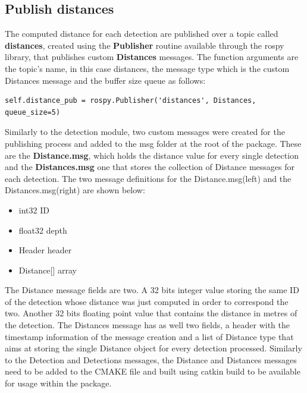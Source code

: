 \subsection{Publish distances}

The computed distance for each detection are published over a topic called \textbf{distances}, created using the \textbf{Publisher} routine available through the rospy library, that publishes custom \textbf{Distances} messages. The function arguments are the topic's name, in this case distances, the message type which is the custom Distances message and the buffer size queue as follows:

\begin{lstlisting}
self.distance_pub = rospy.Publisher('distances', Distances, queue_size=5)
\end{lstlisting}

Similarly to the detection module, two custom messages were created for the publishing process and added to the msg folder at the root of the package. These are the \textbf{Distance.msg}, which holds the distance value for every single detection and the \textbf{Distances.msg} one that stores the collection of Distance messages for each detection. The two message definitions for the Distance.msg(left) and the Distances.msg(right) are shown below:

\begin{multicols}{2}
  \begin{itemize}
    \item int32 ID
    \item float32 depth
  \end{itemize}

  \columnbreak

  \begin{itemize}
    \item Header header
    \item Distance[] array
  \end{itemize}
\end{multicols}

The Distance message fields are two. A 32 bits integer value storing the same ID of the detection whose distance was just computed in order to correspond the two. Another 32 bits floating point value that contains the distance in metres of the detection. The Distances message has as well two fields, a header with the timestamp information of the message creation and a list of Distance type that aims at storing the single Distance object for every detection processed. Similarly to the Detection and Detections messages, the Distance and Distances messages need to be added to the CMAKE file and built using catkin build to be available for usage within the package.

